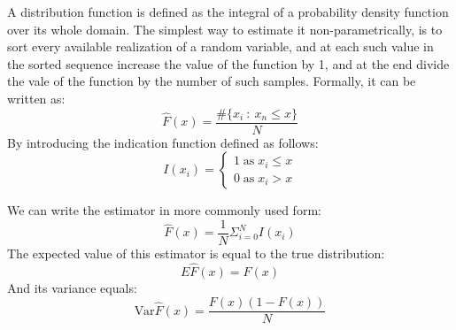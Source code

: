 {
 A distribution function is defined as the integral of a probability density function over its whole domain. The simplest way to estimate it non-parametrically, is to sort every available realization of a random variable, and at each such value in the sorted sequence increase the value of the function by 1, and at the end divide the vale of the function by the number of such samples. Formally, it can be written as:
 \begin{equation}
        \hat{F}(x) = \frac{ \#\{x_i\::\:x_n\le x\}}{N}
 \end{equation}
By introducing the indication function defined as follows:
\begin{equation}
    I(x_i) = \begin{cases}
        1 \; \text{as} \; x_i \le x\\
        0 \; \text{as}\;  x_i > x
    \end{cases}
\end{equation}

We can write the estimator in more commonly used form:
\begin{equation}
    \hat{F}(x) = \frac{1}{N}\Sigma^{N}_{i=0} I(x_i)
\end{equation}
The expected value of this estimator is equal to the true distribution:
\begin{equation}
    E\hat{F}(x) = F(x)
\end{equation}
And its variance equals:
\begin{equation}
    \text{Var}\hat{F}(x) = \frac{F(x)(1-F(x))}{N}
\end{equation}

}


